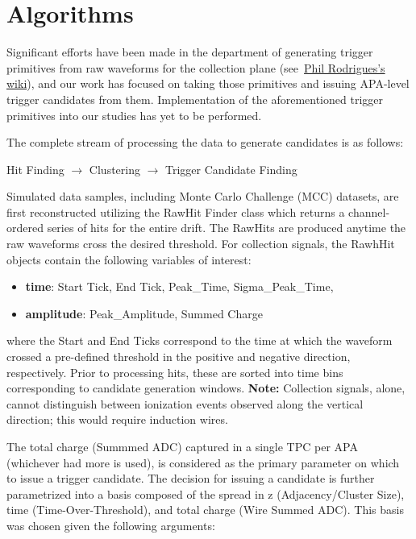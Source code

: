 \documentclass[11pt]{article}
\begin{document}
\section{Algorithms}

Significant efforts have been made in the department of generating trigger primitives from raw waveforms for the collection plane (see~\href{https://wiki.dunescience.org/wiki/Tools_for_2018_Trigger_Primitive_Studies}{Phil Rodrigues's wiki}), and our work has focused on taking those primitives and issuing APA-level trigger candidates from them.
Implementation of the aforementioned trigger primitives into our studies has yet to be performed.

The complete stream of processing the data to generate candidates is as follows:

\begin{center}
Hit Finding $\rightarrow$ Clustering $\rightarrow$ Trigger Candidate Finding    
\end{center}

Simulated data samples, including Monte Carlo Challenge (MCC) datasets, are first reconstructed utilizing the RawHit Finder class which returns a channel-ordered series of hits for the entire drift. The RawHits are produced anytime the raw waveforms cross the desired threshold. For collection signals, the RawhHit objects contain the following variables of interest: 
\begin{itemize}
\setlength\itemsep{0em}
    \item \textbf{time}: Start Tick, End Tick, Peak\_Time, Sigma\_Peak\_Time, 
    \item \textbf{amplitude}: Peak\_Amplitude, Summed Charge 
\end{itemize}

where the Start and End Ticks correspond to the time at which the waveform crossed a pre-defined threshold in the positive and negative direction, respectively. Prior to processing hits, these are sorted into time bins corresponding to candidate generation windows. 
\textbf{Note:} Collection signals, alone, cannot distinguish between ionization events observed along the vertical direction; this would require induction wires. 


The total charge (Summmed ADC) captured in a single TPC per APA (whichever had more is used), is considered as the primary parameter on which to issue a trigger candidate. The decision for issuing a candidate is further parametrized into a basis composed of the spread in z (Adjacency/Cluster Size), time (Time-Over-Threshold), and total charge (Wire Summed ADC). This basis was chosen %
given the following arguments: 
\end{document}
